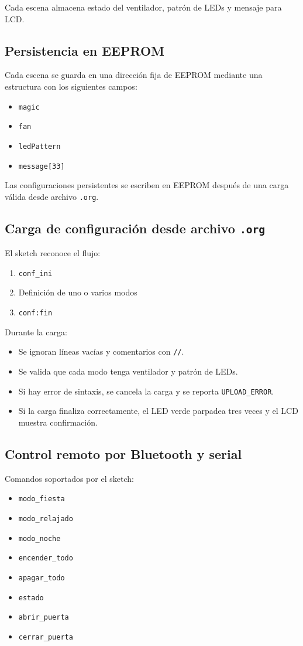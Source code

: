 \documentclass[12pt,a4paper]{article}
\begin{document}
Cada escena almacena estado del ventilador, patrón de LEDs y mensaje para LCD.

\subsection{Persistencia en EEPROM}
Cada escena se guarda en una dirección fija de EEPROM mediante una estructura con los siguientes campos:
\begin{itemize}[leftmargin=1.2cm]
    \item \texttt{magic}
    \item \texttt{fan}
    \item \texttt{ledPattern}
    \item \texttt{message[33]}
\end{itemize}

Las configuraciones persistentes se escriben en EEPROM después de una carga válida desde archivo \texttt{.org}.

\subsection{Carga de configuración desde archivo \texttt{.org}}
El sketch reconoce el flujo:
\begin{enumerate}
    \item \texttt{conf\_ini}
    \item Definición de uno o varios modos
    \item \texttt{conf:fin}
\end{enumerate}

Durante la carga:
\begin{itemize}[leftmargin=1.2cm]
    \item Se ignoran líneas vacías y comentarios con \texttt{//}.
    \item Se valida que cada modo tenga ventilador y patrón de LEDs.
    \item Si hay error de sintaxis, se cancela la carga y se reporta \texttt{UPLOAD\_ERROR}.
    \item Si la carga finaliza correctamente, el LED verde parpadea tres veces y el LCD muestra confirmación.
\end{itemize}

\subsection{Control remoto por Bluetooth y serial}
Comandos soportados por el sketch:
\begin{itemize}[leftmargin=1.2cm]
    \item \texttt{modo\_fiesta}
    \item \texttt{modo\_relajado}
    \item \texttt{modo\_noche}
    \item \texttt{encender\_todo}
    \item \texttt{apagar\_todo}
    \item \texttt{estado}
    \item \texttt{abrir\_puerta}
    \item \texttt{cerrar\_puerta}
\end{itemize}
\end{document}
